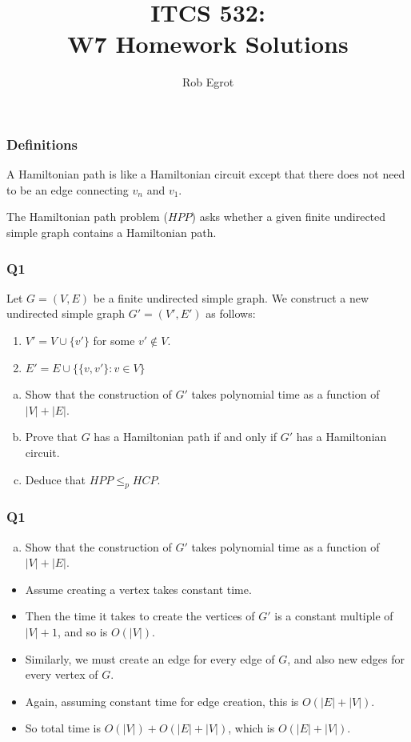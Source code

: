 \documentclass[handout]{beamer}
\title{ITCS 532:\\ W7 Homework Solutions}
\date{}
\author{Rob Egrot}
\begin{document}
\begin{frame}
\titlepage
\end{frame}

\begin{frame}
\frametitle{Definitions}
\begin{definition}
A Hamiltonian path is like a Hamiltonian circuit except that there does not need to be an edge connecting $v_n$ and $v_1$.
\end{definition}
\vspace{1cm}
\begin{definition}[$HPP$]
The Hamiltonian path problem ($HPP$) asks whether a given finite undirected simple graph contains a Hamiltonian path.
\end{definition}
\end{frame}

\begin{frame}
\frametitle{Q1}
Let $G=(V,E)$ be a finite undirected simple graph. We construct a new undirected simple graph $G'=(V',E')$ as follows:
\begin{enumerate}
\item $V'=V\cup\{v'\}$ for some $v'\notin V$.
\item $E'= E\cup \{\{v,v'\}:v\in V\}$
\end{enumerate}
\begin{enumerate}[a)]
\item Show that the construction of $G'$ takes polynomial time as a function of $|V|+|E|$.
\item Prove that $G$ has a Hamiltonian path if and only if $G'$ has a Hamiltonian circuit.
\item Deduce that $HPP\leq_p HCP$.
\end{enumerate}
\end{frame}

\begin{frame}
\frametitle{Q1}
\begin{enumerate}[a)]
\item Show that the construction of $G'$ takes polynomial time as a function of $|V|+|E|$.
\end{enumerate}
\begin{itemize}
\item Assume creating a vertex takes constant time.
\vspace{0.2cm}
\item Then the time it takes to create the vertices of $G'$ is a constant multiple of $|V|+1$, and so is $O(|V|)$. 
\vspace{0.2cm}
\item Similarly, we must create an edge for every edge of $G$, and also new edges for every vertex of $G$. 
\vspace{0.2cm}
\item Again, assuming constant time for edge creation, this is $O(|E|+|V|)$.
\vspace{0.2cm}
\item So total time is $O(|V|)+O(|E|+|V|)$, which is $O(|E|+|V|)$.
\end{itemize}
\end{frame}
\end{document}
